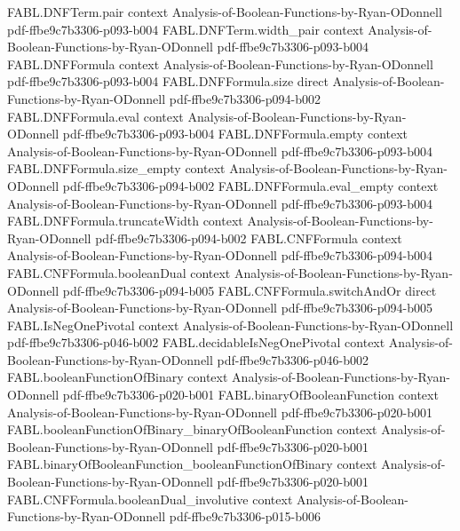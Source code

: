 \begin{theorem}
  {FABL.DNFTerm.pair}
  {context}
  {Analysis-of-Boolean-Functions-by-Ryan-ODonnell}
  {pdf-ffbe9c7b3306-p093-b004}
\proofstep
  {FABL.DNFTerm.width_pair}
  {context}
  {Analysis-of-Boolean-Functions-by-Ryan-ODonnell}
  {pdf-ffbe9c7b3306-p093-b004}
\proofstep
  {FABL.DNFFormula}
  {context}
  {Analysis-of-Boolean-Functions-by-Ryan-ODonnell}
  {pdf-ffbe9c7b3306-p093-b004}
\proofstep
  {FABL.DNFFormula.size}
  {direct}
  {Analysis-of-Boolean-Functions-by-Ryan-ODonnell}
  {pdf-ffbe9c7b3306-p094-b002}
\proofstep
  {FABL.DNFFormula.eval}
  {context}
  {Analysis-of-Boolean-Functions-by-Ryan-ODonnell}
  {pdf-ffbe9c7b3306-p093-b004}
\proofstep
  {FABL.DNFFormula.empty}
  {context}
  {Analysis-of-Boolean-Functions-by-Ryan-ODonnell}
  {pdf-ffbe9c7b3306-p093-b004}
\proofstep
  {FABL.DNFFormula.size_empty}
  {context}
  {Analysis-of-Boolean-Functions-by-Ryan-ODonnell}
  {pdf-ffbe9c7b3306-p094-b002}
\proofstep
  {FABL.DNFFormula.eval_empty}
  {context}
  {Analysis-of-Boolean-Functions-by-Ryan-ODonnell}
  {pdf-ffbe9c7b3306-p093-b004}
\proofstep
  {FABL.DNFFormula.truncateWidth}
  {context}
  {Analysis-of-Boolean-Functions-by-Ryan-ODonnell}
  {pdf-ffbe9c7b3306-p094-b002}
\proofstep
  {FABL.CNFFormula}
  {context}
  {Analysis-of-Boolean-Functions-by-Ryan-ODonnell}
  {pdf-ffbe9c7b3306-p094-b004}
\proofstep
  {FABL.CNFFormula.booleanDual}
  {context}
  {Analysis-of-Boolean-Functions-by-Ryan-ODonnell}
  {pdf-ffbe9c7b3306-p094-b005}
\proofstep
  {FABL.CNFFormula.switchAndOr}
  {direct}
  {Analysis-of-Boolean-Functions-by-Ryan-ODonnell}
  {pdf-ffbe9c7b3306-p094-b005}
\proofstep
  {FABL.IsNegOnePivotal}
  {context}
  {Analysis-of-Boolean-Functions-by-Ryan-ODonnell}
  {pdf-ffbe9c7b3306-p046-b002}
\proofstep
  {FABL.decidableIsNegOnePivotal}
  {context}
  {Analysis-of-Boolean-Functions-by-Ryan-ODonnell}
  {pdf-ffbe9c7b3306-p046-b002}
\proofstep
  {FABL.booleanFunctionOfBinary}
  {context}
  {Analysis-of-Boolean-Functions-by-Ryan-ODonnell}
  {pdf-ffbe9c7b3306-p020-b001}
\proofstep
  {FABL.binaryOfBooleanFunction}
  {context}
  {Analysis-of-Boolean-Functions-by-Ryan-ODonnell}
  {pdf-ffbe9c7b3306-p020-b001}
\proofstep
  {FABL.booleanFunctionOfBinary_binaryOfBooleanFunction}
  {context}
  {Analysis-of-Boolean-Functions-by-Ryan-ODonnell}
  {pdf-ffbe9c7b3306-p020-b001}
\proofstep
  {FABL.binaryOfBooleanFunction_booleanFunctionOfBinary}
  {context}
  {Analysis-of-Boolean-Functions-by-Ryan-ODonnell}
  {pdf-ffbe9c7b3306-p020-b001}
\proofstep
  {FABL.CNFFormula.booleanDual_involutive}
  {context}
  {Analysis-of-Boolean-Functions-by-Ryan-ODonnell}
  {pdf-ffbe9c7b3306-p015-b006}
\proofstep

\end{theorem}
